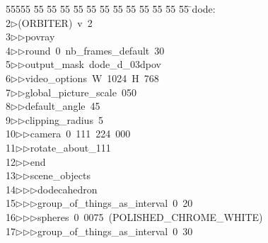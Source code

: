 %
%
\begin{tabbing}
55555 \= 55 \= 55 \= 55 \= 55 \= 55 \= 55 \= 55 \= 55 \= 55 \= 55 \= 55 \= 55 \= \>dode:\\[0pt]
2\>$\triangleright$\>(ORBITER)\ v\ 2\ \\[0pt]
3\>$\triangleright$\>$\triangleright$\>povray\ \\[0pt]
4\>$\triangleright$\>$\triangleright$\>round\ 0\ nb\_frames\_default\ 30\ \\[0pt]
5\>$\triangleright$\>$\triangleright$\>output\_mask\ dode\_d\_03dpov\ \\[0pt]
6\>$\triangleright$\>$\triangleright$\>video\_options\ W\ 1024\ H\ 768\ \\[0pt]
7\>$\triangleright$\>$\triangleright$\>global\_picture\_scale\ 050\ \\[0pt]
8\>$\triangleright$\>$\triangleright$\>default\_angle\ 45\ \\[0pt]
9\>$\triangleright$\>$\triangleright$\>clipping\_radius\ 5\ \ \ \\[0pt]
10\>$\triangleright$\>$\triangleright$\>camera\ 0\ 111\ 224\ 000\ \ \\[0pt]
11\>$\triangleright$\>$\triangleright$\>rotate\_about\_111\ \\[0pt]
12\>$\triangleright$\>$\triangleright$\>end\ \\[0pt]
13\>$\triangleright$\>$\triangleright$\>scene\_objects\ \\[0pt]
14\>$\triangleright$\>$\triangleright$\>$\triangleright$\>dodecahedron\ \\[0pt]
15\>$\triangleright$\>$\triangleright$\>$\triangleright$\>group\_of\_things\_as\_interval\ 0\ 20\ \\[0pt]
16\>$\triangleright$\>$\triangleright$\>$\triangleright$\>spheres\ 0\ 0075\ (POLISHED\_CHROME\_WHITE)\ \\[0pt]
17\>$\triangleright$\>$\triangleright$\>$\triangleright$\>group\_of\_things\_as\_interval\ 0\ 30\\[0pt]

\end{tabbing}
